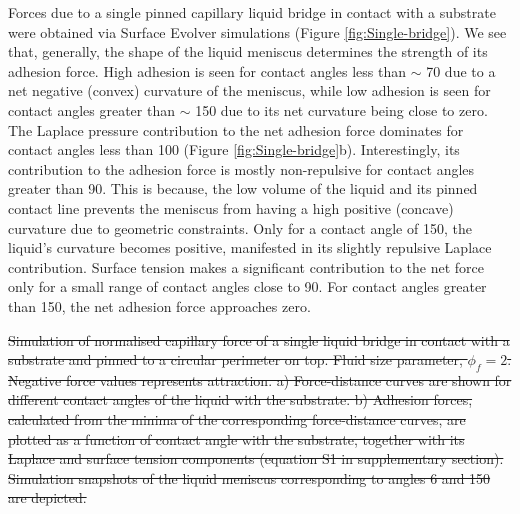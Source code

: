 \documentclass[vruler,JEB]{COB}%
\providecommand{\DIFadd}[1]{{\protect\color{blue}\uwave{#1}}} %
\providecommand{\DIFdel}[1]{{\protect\color{red}\sout{#1}}}                      %
\providecommand{\DIFaddbegin}{} %
\providecommand{\DIFaddend}{} %
\providecommand{\DIFdelbegin}{} %
\providecommand{\DIFdelFL}[1]{\DIFdel{#1}} %
\begin{document}
Forces due to a single pinned capillary liquid bridge in contact with
a substrate were obtained via Surface Evolver simulations (Figure \ref{fig:Single-bridge}).
We see that, generally, the shape of the liquid meniscus determines
the strength of its adhesion force. High adhesion \DIFaddbegin \DIFadd{(> 60 \% of maximum) }\DIFaddend is seen for contact
angles less than $\sim$ 70\textdegree{} due to a net negative (convex) curvature
of the meniscus, while low adhesion \DIFaddbegin \DIFadd{(< 10 \% of maximum) }\DIFaddend is seen for contact angles greater
than $\sim$ 150\textdegree{} due to its net curvature being close
to zero. The Laplace pressure contribution to the net adhesion force
dominates for contact angles less than 100\textdegree{} (Figure \ref{fig:Single-bridge}b).
Interestingly, its contribution to the adhesion force is mostly non-repulsive
for contact angles greater than 90\textdegree . This is because, the
low volume of the liquid and its pinned contact line prevents the
meniscus from having a high positive (concave) curvature due to geometric constraints.
Only for a contact angle of 150\textdegree , the liquid's curvature
becomes positive, manifested in its slightly repulsive Laplace contribution.
Surface tension makes a significant contribution to the net force
only for a small range of contact angles close to 90\textdegree .
For contact angles greater than 150\textdegree , the net adhesion
force approaches zero.


\DIFdelbegin %
{%
\DIFdelFL{Simulation of normalised capillary force of a single liquid
bridge in contact with a substrate and pinned to a circular perimeter
on top. Fluid size parameter, $\phi_{f}=2$. Negative force values
represents attraction. a) Force-distance curves are shown for different
contact angles of the liquid with the substrate. b) Adhesion forces,
calculated from the minima of the corresponding force-distance curves,
are plotted as a function of contact angle with the substrate, together
with its Laplace and surface tension components (equation S1 in supplementary section).
Simulation snapshots of the liquid meniscus corresponding to angles
6\textdegree{} and 150\textdegree{} are depicted.}}
\end{document}
